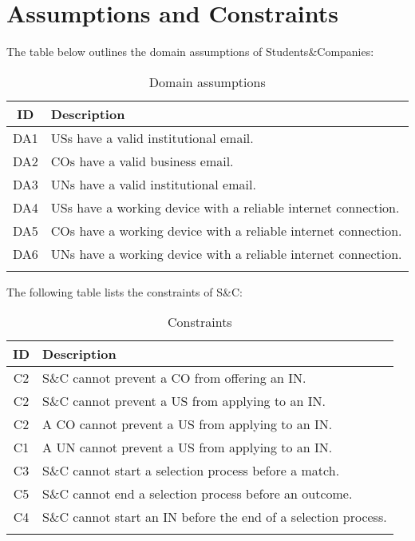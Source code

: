 \section{Assumptions and Constraints}
The table below outlines the domain assumptions of Students\&Companies:

\renewcommand{\arraystretch}{1.5}
\begin{longtable}{|c|p{12.5cm}|}
    \hline \rowcolor{polimiblue!40}
    \textbf{ID} & \textbf{Description} \\ \hline \hline
    DA1 & USs have a valid institutional email. \\ \hline
    DA2 & COs have a valid business email. \\ \hline
    DA3 & UNs have a valid institutional email. \\ \hline
    DA4 & USs have a working device with a reliable internet connection. \\ \hline
    DA5 & COs have a working device with a reliable internet connection. \\ \hline
    DA6 & UNs have a working device with a reliable internet connection. \\ \hline
\caption{Domain assumptions}
\end{longtable}

The following table lists the constraints of S\&C: 

\renewcommand{\arraystretch}{1.5}
\begin{longtable}{|c|p{12.5cm}|}
    \hline \rowcolor{polimiblue!40}
    \textbf{ID} & \textbf{Description} \\ \hline \hline
    C2 & S\&C cannot prevent a CO from offering an IN. \\ \hline
    C2 & S\&C cannot prevent a US from applying to an IN. \\ \hline
    C2 & A CO cannot prevent a US from applying to an IN. \\ \hline
    C1 & A UN cannot prevent a US from applying to an IN. \\ \hline
    C3 & S\&C cannot start a selection process before a match. \\ \hline
    C5 & S\&C cannot end a selection process before an outcome. \\ \hline
    C4 & S\&C cannot start an IN before the end of a selection process. \\ \hline
\caption{Constraints}
\end{longtable}

